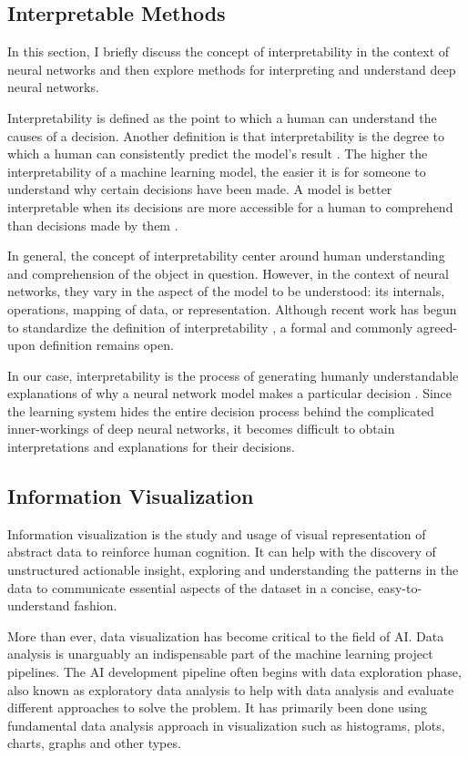 \subsection{Interpretable Methods}

In this section, I briefly discuss the concept of interpretability in the context of neural networks and then explore methods for interpreting and understand deep neural networks.

Interpretability is defined as the point to which a human can understand the causes of a decision. Another definition is that interpretability is the degree to which a human can consistently predict the model’s result \cite{molnar}. The higher the interpretability of a machine learning model, the easier it is for someone to understand why certain decisions have been made. A model is better interpretable when its decisions are more accessible for a human to comprehend than decisions made by them \cite{molnar}.

In general, the concept of interpretability center around human understanding and comprehension of the object in question. However, in the context of neural networks, they vary in the aspect of the model to be understood: its internals, operations, mapping of data, or representation. Although recent work has begun to standardize the definition of interpretability \cite{Lipton2018}, a formal and commonly agreed-upon definition remains open.
    
In our case, interpretability is the process of generating humanly understandable explanations of why a neural network model makes a particular decision \cite{Sacha2017}. Since the learning system hides the entire decision process behind the complicated inner-workings of deep neural networks, it becomes difficult to obtain interpretations and explanations for their decisions.

\subsection{Information Visualization}

Information visualization is the study and usage of visual representation of abstract data to reinforce human cognition. It can help with the discovery of unstructured actionable insight, exploring and understanding the patterns in the data to communicate essential aspects of the dataset in a concise, easy-to-understand fashion.

More than ever, data visualization has become critical to the field of AI. Data analysis is unarguably an indispensable part of the machine learning project pipelines. The AI development pipeline often begins with data exploration phase, also known as exploratory data analysis to help with data analysis and evaluate different approaches to solve the problem. It has primarily been done using fundamental data analysis approach in visualization such as histograms, plots, charts, graphs and other types.

